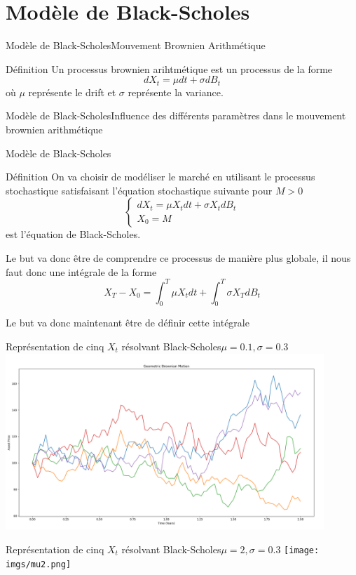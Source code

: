 \documentclass{beamer}
\newcommand{\1}{\mathmybb{1}}
\begin{document}
\section{Modèle de Black-Scholes}
\begin{frame}{Modèle de Black-Scholes}{Mouvement Brownien Arithmétique}
  \begin{block}{Définition}
    Un processus brownien arihtmétique est un processus de la forme
    \begin{equation}
      dX_{t} = \mu dt + \sigma dB_{t}
    \end{equation}
    où $\mu$ représente le drift et $\sigma$ représente la variance.
    \end{block}
  \end{frame}
  \begin{frame}{Modèle de Black-Scholes}{Influence des différents paramètres dans le mouvement brownien arithmétique}

    \end{frame}
\begin{frame}{Modèle de Black-Scholes}
  \begin{block}{Définition}
    On va choisir de modéliser le marché en utilisant le processus stochastique satisfaisant l'équation stochastique suivante pour $M > 0$
    \begin{equation}
      \begin{cases}
        dX_{t} = \mu X_{t} dt + \sigma X_{t} dB_{t} \\
        X_{0} = M
      \end{cases}
      \end{equation}
      est l'équation de Black-Scholes. \\
    \end{block}
    \pause
    \begin{alertblock}{}
    Le but va donc être de comprendre ce processus de manière plus globale, il nous faut donc une intégrale de la forme
    \[
      X_{T} - X_{0} = \int_0^{T} \mu X_{t} dt + \int_{0}^{T} \sigma X_{T} dB_{t}
    \]
  \end{alertblock}
  \pause
  Le but va donc maintenant être de définir cette intégrale
\end{frame}
 \begin{frame}{Représentation de cinq $X_{t}$ résolvant Black-Scholes}{$\mu =0.1, \sigma =0.3$}
   \includegraphics[width=12cm]{imgs/bs5.png}
 \end{frame}
 \begin{frame}{Représentation de cinq $X_{t}$ résolvant Black-Scholes}{$\mu =2, \sigma =0.3$}
   \texttt{[image: imgs/mu2.png]}
 \end{frame}
\end{document}
